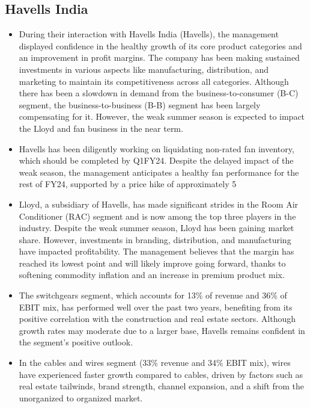 \subsection{Havells India}

\begin{itemize}
  \item During their interaction with Havells India (Havells), the management displayed confidence in the healthy growth of its core product categories and an improvement in profit margins. The company has been making sustained investments in various aspects like manufacturing, distribution, and marketing to maintain its competitiveness across all categories. Although there has been a slowdown in demand from the business-to-consumer (B-C) segment, the business-to-business (B-B) segment has been largely compensating for it. However, the weak summer season is expected to impact the Lloyd and fan business in the near term.

  \item Havells has been diligently working on liquidating non-rated fan inventory, which should be completed by Q1FY24. Despite the delayed impact of the weak season, the management anticipates a healthy fan performance for the rest of FY24, supported by a price hike of approximately 5%

  \item Lloyd, a subsidiary of Havells, has made significant strides in the Room Air Conditioner (RAC) segment and is now among the top three players in the industry. Despite the weak summer season, Lloyd has been gaining market share. However, investments in branding, distribution, and manufacturing have impacted profitability. The management believes that the margin has reached its lowest point and will likely improve going forward, thanks to softening commodity inflation and an increase in premium product mix.

  \item The switchgears segment, which accounts for 13\% of revenue and 36\% of EBIT mix, has performed well over the past two years, benefiting from its positive correlation with the construction and real estate sectors. Although growth rates may moderate due to a larger base, Havells remains confident in the segment's positive outlook. 

  \item In the cables and wires segment (33\% revenue and 34\% EBIT mix), wires have experienced faster growth compared to cables, driven by factors such as real estate tailwinds, brand strength, channel expansion, and a shift from the unorganized to organized market.


\end{itemize}
